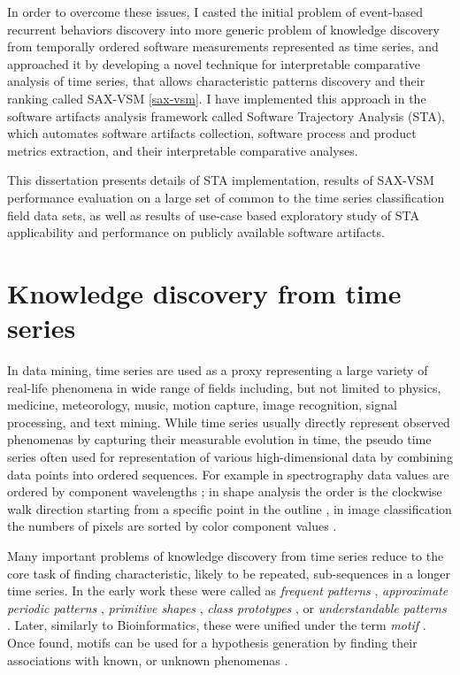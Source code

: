In order to overcome these issues, I casted the initial problem of event-based recurrent behaviors 
discovery into more generic problem of knowledge discovery from temporally ordered software measurements 
represented as time series, and approached it by developing a novel technique for interpretable 
comparative analysis of time series, that allows characteristic patterns discovery and their ranking 
called SAX-VSM \ref{sax-vsm}. I have implemented this approach in the software artifacts analysis framework 
called Software Trajectory Analysis (STA), which automates software artifacts collection, software process and 
product metrics extraction, and their interpretable comparative analyses. 

This dissertation presents details of STA implementation, results of SAX-VSM performance evaluation on a large 
set of common to the time series classification field data sets, as well as results of use-case based exploratory 
study of STA applicability and performance on publicly available software artifacts.

%
%
\section{Knowledge discovery from time series}\label{section_knowledge_discovery}
In data mining, time series are used as a proxy representing a large variety of real-life phenomena 
in wide range of fields including, but not limited to physics, medicine, meteorology, 
music, motion capture, image recognition, signal processing, and text mining. 
While time series usually directly represent observed phenomenas by capturing their measurable evolution 
in time, the pseudo time series often used for representation of various high-dimensional data 
by combining data points into ordered sequences. 
For example in spectrography data values are ordered by component wavelengths \cite{citeulike:12550833};
in shape analysis the order is the clockwise walk direction starting from a
specific point in the outline \cite{citeulike:12550835}, in image classification the numbers of pixels
are sorted by color component values \cite{citeulike:2900542}.

Many important problems of knowledge discovery from time series reduce to the core task of finding 
characteristic, likely to be repeated, sub-sequences in a longer time series. 
In the early work these were called as 
\textit{frequent patterns} \cite{citeulike:5159615}, 
\textit{approximate periodic patterns} \cite{citeulike:1959582},
\textit{primitive shapes} \cite{citeulike:5898869}, 
\textit{class prototypes} \cite{citeulike:4406444}, 
or \textit{understandable patterns} \cite{citeulike:3978076}. 
Later, similarly to Bioinformatics, these were unified under the term \textit{motif} \cite{citeulike:3977965}.
Once found, motifs can be used for a hypothesis generation by finding their associations with known,
or unknown phenomenas \cite{citeulike:3977965}. 

